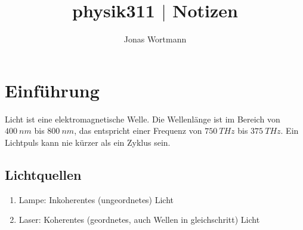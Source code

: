 \documentclass[a4paper,12pt]{article}
\numberwithin{equation}{section}
\begin{document}

\title{physik311 $|$ Notizen}
\author{Jonas Wortmann}
\maketitle
{}


\newpage


\fancyhead[L]{\thepage}
\fancyfoot[C]{}

\tableofcontents


\newpage


\fancyhead[R]{\leftmark\\\rightmark}

\section{Einführung}
Licht ist eine elektromagnetische Welle. Die Wellenlänge ist im Bereich von $\SI{400}{nm}$ bis $\SI{800}{nm}$, das entspricht einer Frequenz von $\SI{750}{THz}$ bis $\SI{375}{THz}$. Ein Lichtpuls kann nie kürzer als ein Zyklus sein.

\subsection{Lichtquellen}
\begin{enumerate}[label=--]
        \item Lampe: Inkoherentes (\glqq ungeordnetes\grqq{}) Licht
        \item Laser: Koherentes (\glqq geordnetes\grqq{}, auch Wellen in \glqq gleichschritt\grqq{}) Licht
\end{enumerate}

\newpage
\end{document}
